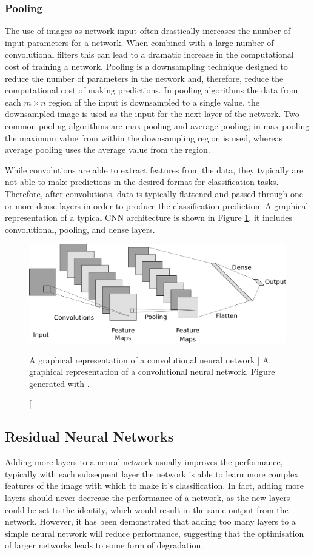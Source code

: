 \subsubsection*{Pooling}
The use of images as network input often drastically increases the number of
input parameters for a network. When combined with a large number of
convolutional filters this can lead to a dramatic increase in the computational
cost of training a network. Pooling\cite{5537907} is a downsampling technique 
designed to reduce the number of parameters in the network and, therefore, 
reduce the computational cost of making predictions. In pooling algorithms
the data from each $m \times n$ region of the input is downsampled to a single 
value, the downsampled image is used as the input for the next layer of the 
network. Two common pooling algorithms are max pooling and average pooling; in 
max pooling the maximum value from within the downsampling region is used, 
whereas average pooling uses the average value from the region.

\medskip\noindent
While convolutions are able to extract features from the data, they typically
are not able to make predictions in the desired format for classification tasks.
Therefore, after convolutions, data is typically flattened and passed through
one or more dense layers in order to produce the classification prediction. A
graphical representation of a typical CNN architecture is shown in Figure
\ref{fig:cnn_layer}, it includes convolutional, pooling, and dense layers.
\begin{figure}
	\centering
	\includegraphics[width = \textwidth]{figures/cnn_layer.png}
	\caption
	[A graphical representation of a convolutional neural network.]
	{ A graphical representation of a convolutional neural network. Figure
	generated with \cite{cnn_diagrams}.}
	\label{fig:cnn_layer}
\end{figure}

\subsection{Residual Neural Networks}
Adding more layers to a neural network usually improves the performance,
typically with each subsequent layer the network is able to learn more complex 
features of the image with which to make it's classification. In fact, adding 
more layers should never decrease the performance of a network, as the new 
layers could be set to the identity, which would result in the same output 
from the network. However, it has been demonstrated that adding too many 
layers to a simple neural network will reduce performance, suggesting that the 
optimisation of larger networks leads to some form of 
degradation\cite{He_2016_CVPR}.

